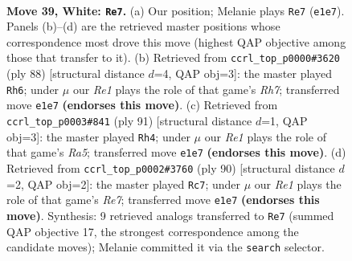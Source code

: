 \documentclass[11pt]{article}
\begin{document}
\clearpage

\begin{figure}[p]\centering
\begin{subfigure}{0.46\textwidth}\centering
\resizebox{\linewidth}{!}{%
\newchessgame
\chessboard[
  setfen={7k/8/8/6K1/p7/P7/7r/4R3 w - - 2 39},
  showmover=false,
  pgfstyle=straightmove, color=movearrow, markmove={e1-e7}
]}
\caption{}
\end{subfigure}\hfill
\begin{subfigure}{0.46\textwidth}\centering
\resizebox{\linewidth}{!}{%
\newchessgame
\chessboard[
  setfen={8/7R/5p2/5P2/r5k1/4K3/8/8 w - - 2 45},
  showmover=false,
  pgfstyle=straightmove, color=movearrow, markmove={h7-h6}
]}
\caption{}
\end{subfigure}
\\[4pt]
\begin{subfigure}{0.46\textwidth}\centering
\resizebox{\linewidth}{!}{%
\newchessgame
\chessboard[
  setfen={8/6R1/8/5p1P/r7/5k2/8/6K1 b - - 0 46},
  showmover=false,
  pgfstyle=straightmove, color=movearrow, markmove={a4-h4}
]}
\caption{}
\end{subfigure}\hfill
\begin{subfigure}{0.46\textwidth}\centering
\resizebox{\linewidth}{!}{%
\newchessgame
\chessboard[
  setfen={6k1/4R3/8/8/8/1Pp2K2/8/6r1 w - - 0 46},
  showmover=false,
  pgfstyle=straightmove, color=movearrow, markmove={e7-c7}
]}
\caption{}
\end{subfigure}
\caption{\textbf{Move 39, White: \texttt{Re7}.} (a) Our position; Melanie plays \texttt{Re7} (\texttt{e1e7}). Panels (b)--(d) are the retrieved master positions whose correspondence most drove this move (highest QAP objective among those that transfer to it). (b) Retrieved from \texttt{ccrl\_top\_p0000\#3620} (ply 88) [structural distance $d$=4, QAP obj=3]: the master played \texttt{Rh6}; under $\mu$ our \emph{Re1} plays the role of that game's \emph{Rh7}; transferred move \texttt{e1e7} \textbf{(endorses this move)}. (c) Retrieved from \texttt{ccrl\_top\_p0003\#841} (ply 91) [structural distance $d$=1, QAP obj=3]: the master played \texttt{Rh4}; under $\mu$ our \emph{Re1} plays the role of that game's \emph{Ra5}; transferred move \texttt{e1e7} \textbf{(endorses this move)}. (d) Retrieved from \texttt{ccrl\_top\_p0002\#3760} (ply 90) [structural distance $d$=2, QAP obj=2]: the master played \texttt{Rc7}; under $\mu$ our \emph{Re1} plays the role of that game's \emph{Re7}; transferred move \texttt{e1e7} \textbf{(endorses this move)}. Synthesis: 9 retrieved analogs transferred to \texttt{Re7} (summed QAP objective 17, the strongest correspondence among the candidate moves); Melanie committed it via the \texttt{search} selector.}
\label{fig:thought-m76}
\end{figure}
\end{document}
